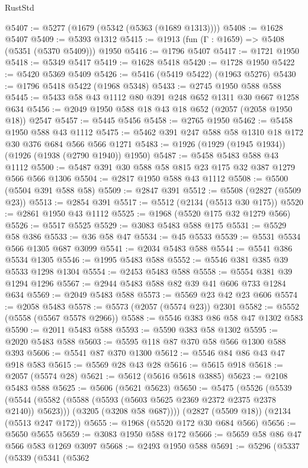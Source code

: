 \begin{lexlean}{RustStd}
\begin{coremodule}
@5407 := @5277 (@1679 (@5342 (@5363 (@1689 @1313))))
@5408 := @1628 @5407
@5409 := @5393 @1312
@5415 := @1913 (fun (Γ : @1659) => @5408 (@5351 (@5370 @5409))) @1950
@5416 := @1796 @5407
@5417 := @1721 @1950
@5418 := @5349 @5417
@5419 := @1628 @5418
@5420 := @1728 @1950
@5422 := @5420 @5369 @5409
@5426 := @5416 (@5419 @5422) (@1963 @5276)
@5430 := @1796 @5418 @5422 (@1968 @5348)
@5433 := @2745 @1950 @588 @588
@5445 := @5433 @58 @43 @1112 @80 @391 @248 @652 @1311 @30 @667 @1258 @634
@5456 := @2049 @1950 @588 @18 @43 @18 @652 (@2057 (@2058 @1950 @18)) @2547
@5457 := @5445 @5456
@5458 := @2765 @1950
@5462 := @5458 @1950 @588 @43 @1112
@5475 := @5462 @391 @247 @588 @58 @1310 @18 @172 @30 @376 @684 @566 @566 @1271
@5483 := @1926 (@1929 (@1945 @1934)) (@1926 (@1938 (@2790 @1940)) @1950)
@5487 := @5458 @5483 @588 @43 @1112
@5500 := @5487 @391 @30 @588 @58 @815 @23 @175 @32 @387 @1279 @566 @566 @1306
@5504 := @2817 @1950 @588 @43 @1112
@5508 := @5500 (@5504 @391 @588 @58)
@5509 := @2847 @391
@5512 := @5508 (@2827 (@5509 @23))
@5513 := @2854 @391
@5517 := @5512 (@2134 (@5513 @30 @175))
@5520 := @2861 @1950 @43 @1112
@5525 := @1968 (@5520 @175 @32 @1279 @566)
@5526 := @5517 @5525
@5529 := @3083 @5483 @588 @175
@5531 := @5529 @58 @386
@5533 := @36 @58 @47
@5534 := @45 @5533
@5539 := @5531 @5534 @566 @1305 @687 @3099
@5541 := @2034 @5483 @588
@5544 := @5541 @386 @5534 @1305
@5546 := @1995 @5483 @588
@5552 := @5546 @381 @385 @39 @5533 @1298 @1304
@5554 := @2453 @5483 @588
@5558 := @5554 @381 @39 @1294 @1296
@5567 := @2944 @5483 @588 @82 @39 @41 @606 @733 @1284 @634
@5569 := @2049 @5483 @588
@5573 := @5569 @23 @42 @23 @606
@5574 := @2058 @5483
@5578 := @5573 (@2057 (@5574 @23)) @2301
@5582 := @5552 (@5558 (@5567 @5578 @2966))
@5588 := @5546 @383 @86 @58 @47 @1302 @583
@5590 := @2011 @5483 @588
@5593 := @5590 @383 @58 @1302
@5595 := @2020 @5483 @588
@5603 := @5595 @118 @87 @370 @58 @566 @1300 @588 @393
@5606 := @5541 @87 @370 @1300
@5612 := @5546 @84 @86 @43 @47 @918 @583
@5615 := @5569 @28 @43 @28
@5616 := @5615 @918
@5618 := @2057 (@5574 @28)
@5621 := @5612 (@5616 @5618 @3885)
@5623 := @2108 @5483 @588
@5625 := @5606 (@5621 @5623)
@5650 := @5475
    (@5526
      (@5539
        (@5544 (@5582 (@5588 (@5593 (@5603 @5625 @2369 @2372 @2375 @2378 @2140)) @5623)))
        (@3205 (@3208 @58 @687))))
    (@2827 (@5509 @18))
    (@2134 (@5513 @247 @172))
@5655 := @1968 (@5520 @172 @30 @684 @566)
@5656 := @5650 @5655
@5659 := @3083 @1950 @588 @172
@5666 := @5659 @58 @86 @47 @566 @583 @1269 @3097
@5668 := @2493 @1950 @588
@5691 := @5296
    (@5337
      (@5339
        (@5341
          (@5362

\end{coremodule}
\end{lexlean}
